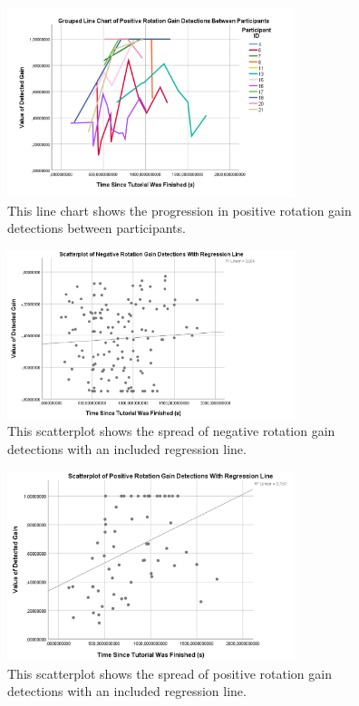 \begin{figure}[tbph]
    \centering
    \includegraphics[width=0.75\textwidth]{figures/graphs/PositiveRotationDetectionsLineChart.png}
    \caption[Line Chart of Positive Rotation Gain Detections Between Participants]{This line chart shows the progression in positive rotation gain detections between participants.}
    \label{fig:positiveRotationDetectionLineChart}
\end{figure}

\begin{figure}[tbph]
    \centering
    \includegraphics[width=0.75\textwidth]{figures/graphs/NegRotDetectionsRegLine.png}
    \caption[Scatterplot For Negative Rotation Gain Detections Including Regression Line]{This scatterplot shows the spread of negative rotation gain detections with an included regression line.}
    \label{fig:negRotRegLine}
\end{figure}

\begin{figure}[tbph]
    \centering
    \includegraphics[width=0.75\textwidth]{figures/graphs/PosRotDetectionsRegLine.png}
    \caption[Scatterplot For Positive  Rotation Gain Detections Including Regression Line]{This scatterplot shows the spread of positive rotation gain detections with an included regression line.}
    \label{fig:posRotRegLine}
\end{figure}

